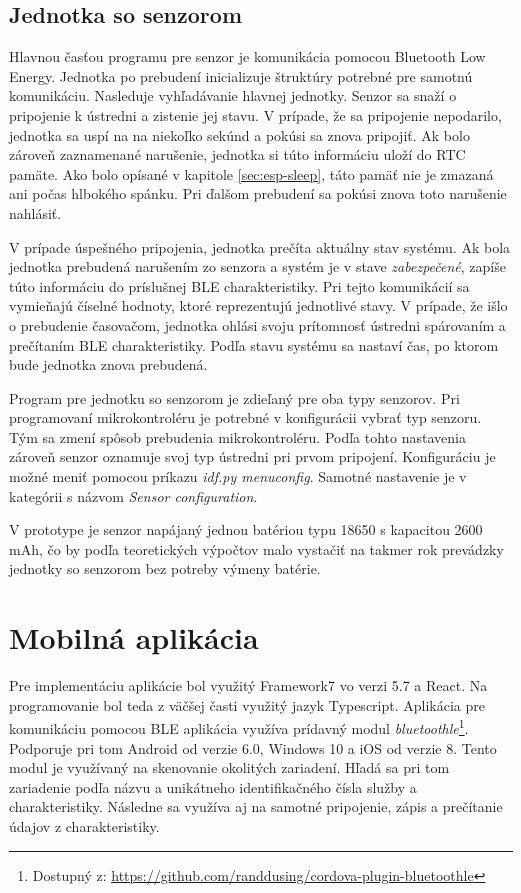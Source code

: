 \subsection{Jednotka so senzorom}

Hlavnou časťou programu pre senzor je komunikácia pomocou Bluetooth Low Energy. Jednotka po prebudení inicializuje štruktúry potrebné pre samotnú komunikáciu. Nasleduje vyhľadávanie hlavnej jednotky. Senzor sa snaží o pripojenie k ústredni a zistenie jej stavu. V prípade, že sa pripojenie nepodarilo, jednotka sa uspí na na niekoľko sekúnd a pokúsi sa znova pripojiť. Ak bolo zároveň zaznamenané narušenie, jednotka si túto informáciu uloží do RTC pamäte. Ako bolo opísané v kapitole \ref{sec:esp-sleep}, táto pamäť nie je zmazaná ani počas hlbokého spánku. Pri ďalšom prebudení sa pokúsi znova toto narušenie nahlásiť.

V prípade úspešného pripojenia, jednotka prečíta aktuálny stav systému. Ak bola jednotka prebudená narušením zo senzora a systém je v stave \textit{zabezpečené}, zapíše túto informáciu do príslušnej BLE charakteristiky. Pri tejto komunikácií sa vymieňajú číselné hodnoty, ktoré reprezentujú jednotlivé stavy. V prípade, že išlo o prebudenie časovačom, jednotka ohlási svoju prítomnosť ústredni spárovaním a prečítaním BLE charakteristiky. Podľa stavu systému sa nastaví čas, po ktorom bude jednotka znova prebudená.

Program pre jednotku so senzorom je zdieľaný pre oba typy senzorov. Pri programovaní mikrokontroléru je potrebné v konfigurácii vybrať typ senzoru. Tým sa zmení spôsob prebudenia mikrokontroléru. Podľa tohto nastavenia zároveň senzor oznamuje svoj typ ústredni pri prvom pripojení. Konfiguráciu je možné meniť pomocou príkazu \textit{idf.py menuconfig}. Samotné nastavenie je v kategórii s názvom \textit{Sensor configuration}.

V prototype je senzor napájaný jednou batériou typu 18650 s kapacitou 2600 mAh, čo by podľa teoretických výpočtov malo vystačiť na takmer rok prevádzky jednotky so senzorom bez potreby výmeny batérie.

\section{Mobilná aplikácia}

Pre implementáciu aplikácie bol využitý Framework7 vo verzi 5.7 a React. Na programovanie bol teda z väčšej časti využitý jazyk Typescript. Aplikácia pre komunikáciu pomocou BLE aplikácia využíva prídavný modul \textit{bluetoothle}\footnote{Dostupný z: \url{https://github.com/randdusing/cordova-plugin-bluetoothle}}. Podporuje pri tom Android od verzie 6.0, Windows 10 a iOS od verzie 8. Tento modul je využívaný na skenovanie okolitých zariadení. Hľadá sa pri tom zariadenie podľa názvu a unikátneho identifikačného čísla služby a charakteristiky. Následne sa využíva aj na samotné pripojenie, zápis a prečítanie údajov z charakteristiky.

